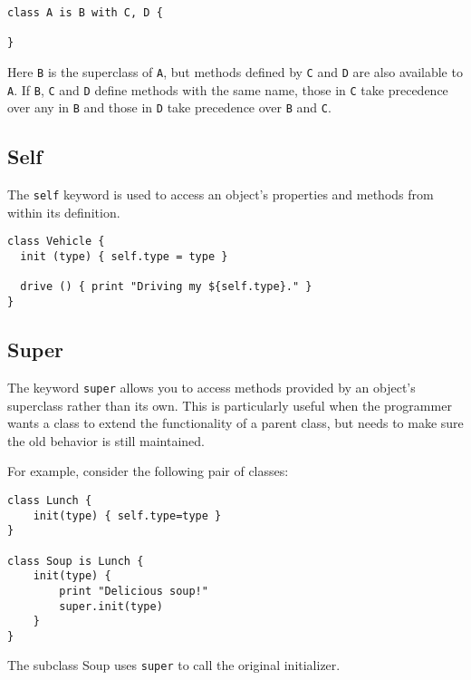 \begin{lstlisting}
class A is B with C, D {

}
\end{lstlisting}

Here \texttt{B} is the superclass of \texttt{A}, but methods defined by
\texttt{C} and \texttt{D} are also available to \texttt{A}. If
\texttt{B}, \texttt{C} and \texttt{D} define methods with the same name,
those in \texttt{C} take precedence over any in \texttt{B} and those in
\texttt{D} take precedence over \texttt{B} and \texttt{C}.

\hypertarget{self}{%
\subsection{Self}\label{self}}

The \texttt{self} keyword is used to access an object's properties and
methods from within its definition.

\begin{lstlisting}
class Vehicle {
  init (type) { self.type = type }

  drive () { print "Driving my ${self.type}." }
}
\end{lstlisting}

\hypertarget{super}{%
\subsection{Super}\label{super}}

The keyword \texttt{super} allows you to access methods provided by an
object's superclass rather than its own. This is particularly useful
when the programmer wants a class to extend the functionality of a
parent class, but needs to make sure the old behavior is still
maintained.

For example, consider the following pair of classes:

\begin{lstlisting}
class Lunch {
    init(type) { self.type=type }
}

class Soup is Lunch {
    init(type) {
        print "Delicious soup!"
        super.init(type)
    }
}
\end{lstlisting}

The subclass Soup uses \texttt{super} to call the original initializer.
